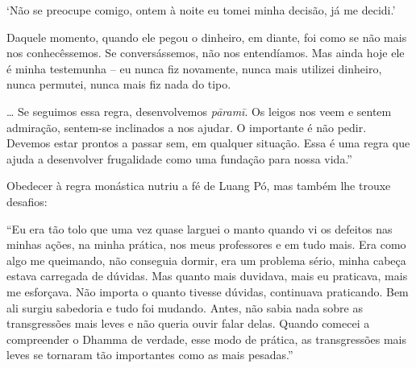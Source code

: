 `Não se preocupe comigo, ontem à noite eu tomei minha decisão, já me
decidi.'

Daquele momento, quando ele pegou o dinheiro, em diante, foi como se não
mais nos conhecêssemos. Se conversássemos, não nos entendíamos. Mas
ainda hoje ele é minha testemunha -- eu nunca fiz novamente, nunca mais
utilizei dinheiro, nunca permutei, nunca mais fiz nada do tipo.

\ldots{} Se seguimos essa regra, desenvolvemos \emph{pāramī}. Os leigos
nos veem e sentem admiração, sentem-se inclinados a nos ajudar. O
importante é não pedir. Devemos estar prontos a passar sem, em qualquer
situação. Essa é uma regra que ajuda a desenvolver frugalidade como uma
fundação para nossa vida.''

Obedecer à regra monástica nutriu a fé de Luang Pó, mas também lhe
trouxe desafios:

``Eu era tão tolo que uma vez quase larguei o manto quando vi os
defeitos nas minhas ações, na minha prática, nos meus professores e em
tudo mais. Era como algo me queimando, não conseguia dormir, era um
problema sério, minha cabeça estava carregada de dúvidas. Mas quanto
mais duvidava, mais eu praticava, mais me esforçava. Não importa o
quanto tivesse dúvidas, continuava praticando. Bem ali surgiu sabedoria
e tudo foi mudando. Antes, não sabia nada sobre as transgressões mais
leves e não queria ouvir falar delas. Quando comecei a compreender o
Dhamma de verdade, esse modo de prática, as transgressões mais leves se
tornaram tão importantes como as mais pesadas.''
